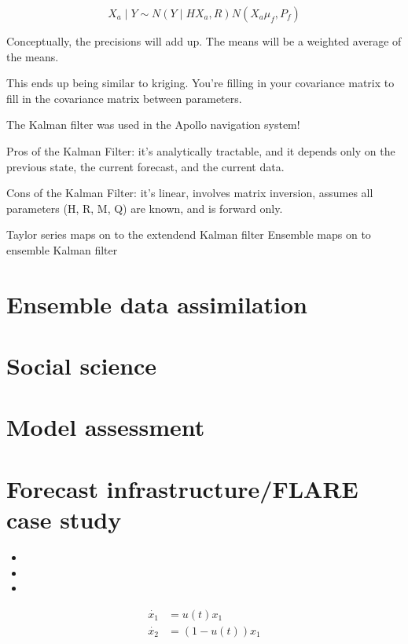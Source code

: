 \documentclass[12pt, oneside]{article}   	%
\begin{document}
$$X_a \mid Y \sim N(Y \mid H X_a, R) N(X_a \mu_f, P_f) $$

Conceptually, the precisions will add up. The means will be a weighted average of the means.

This ends up being similar to kriging. You're filling in your covariance matrix to fill in the covariance matrix between parameters.

The Kalman filter was used in the Apollo navigation system!

Pros of the Kalman Filter: it's analytically tractable, and it depends only on the previous state, the current forecast, and the current data.

Cons of the Kalman Filter: it's linear, involves matrix inversion, assumes all parameters (H, R, M, Q) are known, and is forward only.

Taylor series maps on to the extendend Kalman filter
Ensemble maps on to ensemble Kalman filter

\section{Ensemble data assimilation}

\section{Social science}

\section{Model assessment}

\section{Forecast infrastructure/FLARE case study}


\begin{itemize}
\item 

\item 

\item 

\end{itemize}

\begin{align}
\dot{x_1} & = u(t) x_1 \nonumber \\
\dot{x_2} & = (1-u(t)) x_1 
\end{align}
\end{document}
